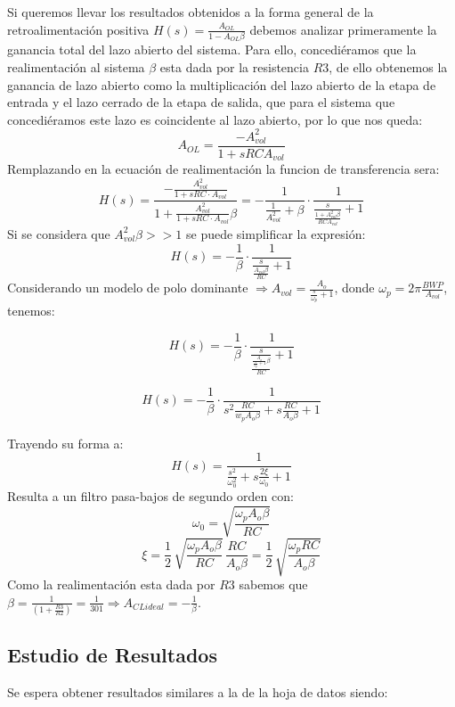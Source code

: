 Si queremos llevar los resultados obtenidos a la forma general de la retroalimentación positiva $H(s) = \frac{A_{OL}}{1-A_{OL}\beta}$ debemos analizar primeramente la ganancia total del lazo abierto del sistema. Para ello, concediéramos que la realimentación al sistema $\beta$ esta dada por la resistencia $R3$, de ello obtenemos la ganancia de lazo abierto como la multiplicación del lazo abierto de la etapa de entrada y el lazo cerrado de la etapa de salida, que para el sistema que concediéramos este lazo es coincidente al lazo abierto, por lo que nos queda:
$$A_{OL} = \frac{-A_{vol}^2}{1 + sRCA_{vol}}$$
Remplazando en la ecuación de realimentación la funcion de transferencia sera:
$$H(s)=\frac{-\frac{A_{vol}^2}{1+sRC\cdot A_{vol}}}{1+\frac{A_{vol}^2}{1+sRC\cdot A_{vol}}\beta}
	=-\frac{1}{\frac{1}{A_{vol}^2}+\beta}\cdot \frac{1}{\frac{s}{\frac{1+A_{vol}^2\beta}{RCA_{vol}}} +1}$$
Si se considera que $A_{vol}^2\beta >> 1$ se puede simplificar la expresi\'on:
	\[H(s) = -\frac{1}{\beta}\cdot \frac{1}{\frac{s}{\frac{A_{vol}\beta}{RC}}+1}\]
Considerando un modelo de polo dominante $\Longrightarrow A_{vol} = \frac{A_o}{\frac{s}{\omega_p}+1}$, donde $\omega_p = 2\pi \frac{BWP}{A_{vol}}$, tenemos:

    $$H(s) = -\frac{1}{\beta} \cdot \frac{1}{\frac{s}{\frac{\frac{A_o}{\frac{s}{\omega _p}+1}\beta}{RC}}+1}$$

$$H(s) = -\frac{1}{\beta} \cdot \frac{1}{s^2\frac{RC}{w_pA_o\beta}+s\frac{RC}{A_o\beta}+1}$$

Trayendo su forma a:
\begin{equation}
H(s) = \frac{1}{\frac{s^2}{\omega_0^2}+s\frac{2\xi}{\omega_0}+1}
\label{ej2FT}
\end{equation}
Resulta a un filtro pasa-bajos de segundo orden con:
$$\omega _0 = \sqrt{\frac{\omega_pA_o\beta}{RC}}$$
$$\xi=\frac{1}{2}\,\sqrt{\frac{\omega_pA_o\beta}{RC}}\,\frac{RC}{A_o\beta}=\frac{1}{2}\,\sqrt{\frac{\omega_pRC}{A_o\beta}}$$
Como la realimentación esta dada por $R3$ sabemos que $\beta = \frac{1}{\left(1 + \frac{R3}{R2}\right)} = \frac{1}{301} \Longrightarrow A_{CLideal} = -\frac{1}{\beta}$.

\subsection{Estudio de Resultados}

Se espera obtener resultados similares a la de la hoja de datos siendo:

